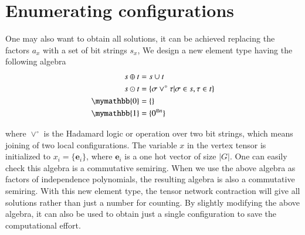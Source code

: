 \documentclass[review,onefignum,onetabnum]{siamart190516}
\newcommand{\<}{\langle}
\renewcommand{\>}{\rangle}
\begin{document}
\section{Enumerating configurations}
One may also want to obtain all solutions, it can be achieved replacing the factors $a_x$ with a set of bit strings $s_x$,
We design a new element type having the following algebra
\begin{align}
\begin{split}
    s \oplus t &= s \cup t\\
    s \odot t &= \{\sigma \lor^\circ \tau | \sigma \in s, \tau \in t\}\\
    \mymathbb{0} &= \{\}\\
    \mymathbb{1} &= \{0^{\otimes n}\}
\end{split}\label{eq:set}
\end{align}

where $\lor^\circ$ is the Hadamard logic or operation over two bit strings, which means joining of two local configurations.
The variable $x$ in the vertex tensor is initialized to $x_i = \{\boldsymbol{e}_{i}\}$,
where $\boldsymbol{e}_i$ is a one hot vector of size $|G|$.
One can easily check this algebra is a commutative semiring.
When we use the above algebra as factors of independence polynomials, the resulting algebra is also a commutative semiring.
With this new element type, the tensor network contraction will give all solutions rather than just a number for counting.
By slightly modifying the above algebra, it can also be used to obtain just a single configuration to save the computational effort.
\end{document}
